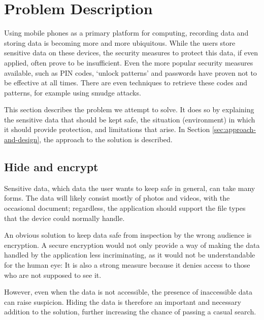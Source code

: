 \section{Problem Description}
\label{sec:problem-description}
Using mobile phones as a primary platform for computing, recording data and storing data is becoming more and more ubiquitous.
While the users store sensitive data on these devices, the security measures to protect this data, if even applied, often prove to be insufficient.
Even the more popular security measures available, such as PIN codes, `unlock patterns' and passwords have proven not to be effective at all times.
There are even techniques to retrieve these codes and patterns, for example using smudge attacks\cite{aviv2010smudge}.

This section describes the problem we attempt to solve.
It does so by explaining the sensitive data that should be kept safe, the situation (environment) in which it should provide protection, and limitations that arise.
In Section \ref{sec:approach-and-design}, the approach to the solution is described. 

\subsection{Hide and encrypt}
Sensitive data, which data the user wants to keep safe in general, can take many forms.
The data will likely consist mostly of photos and videos, with the occasional document; regardless, the application should support the file types that the device could normally handle.

An obvious solution to keep data safe from inspection by the wrong audience is encryption.
A secure encryption would not only provide a way of making the data handled by the application less incriminating, as it would not be understandable for the human eye:
It is also a strong measure because it denies access to those who are not supposed to see it.

However, even when the data is not accessible, the presence of inaccessible data can raise suspicion.
Hiding the data is therefore an important and necessary addition to the solution, further increasing the chance of passing a casual search.

